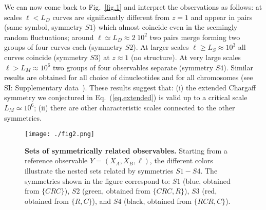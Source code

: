 \documentclass[fleqn,10pt]{wlscirep}
\begin{document}
We can now come back to Fig.~\ref{fig.1} and interpret the observations as follows:  at  scales $\ell<L_D$  curves are significantly different from $z=1$ and appear in pairs  (same symbol, symmetry $S1$) which almost coincide even in the seemingly random fluctuations;  around $\ell \simeq  L_D \approx 2\;10^2$  two pairs merge forming two groups of four curves each (symmetry $S2$).  At larger scales $\ell \ge L_S \approx 10^3$ all curves coincide (symmetry $S3$) at $z \approx 1$ (no structure). At  very large scales $\ell > L_M \approx 10^6$ two groups of four observables separate (symmetry $S4$). Similar results are obtained for all choice of dinucleotides and for all chromosomes (see SI: Supplementary data~\cite{zenodo}). These results suggest that: (i) the extended Chargaff symmetry we conjectured in  Eq.~(\ref{eq.extended}) is valid  up to a critical scale $L_M \simeq 10^6$; (ii)  there are other characteristic scales  connected to the  other symmetries.


 
\begin{figure}[h] 
\centering
\texttt{[image: ./fig2.png]}
\caption{\textbf{Sets of symmetrically related observables.}  Starting from a reference observable $Y=(X_A,X_B,\ell)$, the different colors illustrate the nested sets related by symmetries $S1-S4$. The symmetries shown in the figure correspond to: $S1$ (blue, obtained from $\{CRC\}$), $S2$ (green, obtained from $\{CRC,R\}$), $S3$ (red, obtained from $\{R,C\}$),  and $S4$ (black, obtained from $\{RCR,C\}$).}
\label{fig2}
\end{figure}  
\end{document}
